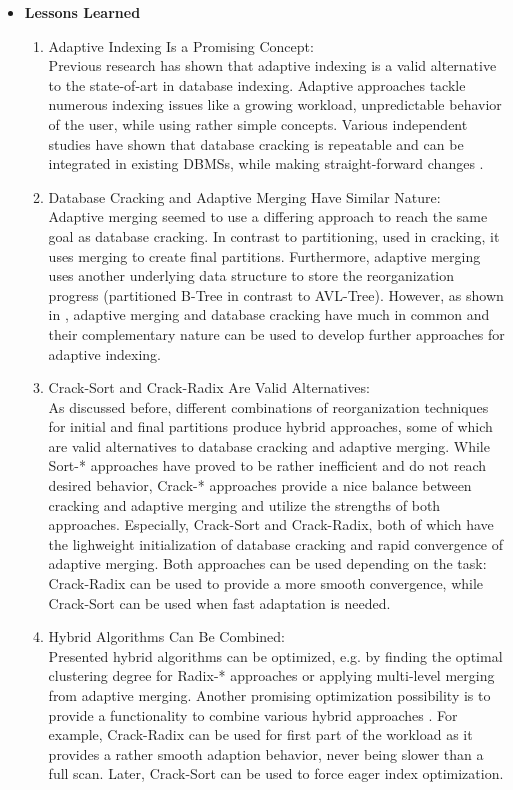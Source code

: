 \documentclass[10pt, conference, compsocconf]{IEEEtran}
\begin{document}
\begin{itemize}
\item{\textbf{Lessons Learned}}
\begin{enumerate}
\item{Adaptive Indexing Is a Promising Concept:}\\
Previous research has shown that adaptive indexing is a valid alternative to the state-of-art in database indexing. Adaptive approaches tackle numerous indexing issues like a growing workload, unpredictable behavior of the user, while using rather simple concepts. Various independent studies have shown that database cracking is repeatable and can be integrated in existing DBMSs, while making straight-forward changes \cite{cracking}.\\
\item{Database Cracking and Adaptive Merging Have Similar Nature:}\\
Adaptive merging seemed to use a differing approach to reach the same goal as database cracking. In contrast to partitioning, used in cracking, it uses merging to create final partitions. Furthermore, adaptive merging uses another underlying data structure to store the reorganization progress (partitioned B-Tree in contrast to AVL-Tree). However, as shown in \cite{hybrid}, adaptive merging and database cracking have much in common and their complementary nature can be used to develop further approaches for adaptive indexing.\\
\item{Crack-Sort and Crack-Radix Are Valid Alternatives:}\\
As discussed before, different combinations of reorganization techniques for initial and final partitions produce hybrid approaches, some of which are valid alternatives to database cracking and adaptive merging. While Sort-* approaches have proved to be rather inefficient and do not reach desired behavior, Crack-* approaches provide a nice balance between cracking and adaptive merging and utilize the strengths of both approaches. Especially, Crack-Sort and Crack-Radix, both of which have the lighweight initialization of database cracking and rapid convergence of adaptive merging. Both approaches can be used depending on the task: Crack-Radix can be used to provide a more smooth convergence, while Crack-Sort can be used when fast adaptation is needed.\\
\item{Hybrid Algorithms Can Be Combined:}\\
Presented hybrid algorithms can be optimized, e.g. by finding the optimal clustering degree for Radix-* approaches or applying multi-level merging from adaptive merging. Another promising optimization possibility is to provide a functionality to combine various hybrid approaches \cite{hybrid}. For example, Crack-Radix can be used for first part of the workload as it provides a rather smooth adaption behavior, never being slower than a full scan. Later, Crack-Sort can be used to force eager index optimization.\\

\end{enumerate}
\end{itemize}
\end{document}
